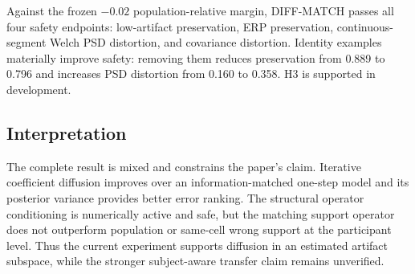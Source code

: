 Against the frozen $-0.02$ population-relative margin, DIFF-MATCH passes all
four safety endpoints: low-artifact preservation, ERP preservation,
continuous-segment Welch PSD distortion, and covariance distortion.  Identity
examples materially improve safety: removing them reduces preservation from
0.889 to 0.796 and increases PSD distortion from 0.160 to 0.358.  H3 is
supported in development.

\subsection{Interpretation}
The complete result is mixed and constrains the paper's claim.  Iterative
coefficient diffusion improves over an information-matched one-step model and
its posterior variance provides better error ranking.  The structural operator
conditioning is numerically active and safe, but the matching support operator
does not outperform population or same-cell wrong support at the participant
level.  Thus the current experiment supports diffusion in an estimated artifact
subspace, while the stronger subject-aware transfer claim remains unverified.
